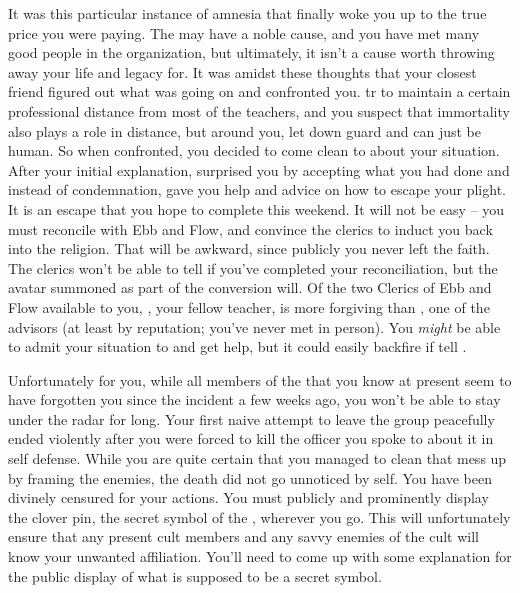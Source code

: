 \documentclass[char]{GL2020}
\begin{document}
It was this particular instance of amnesia that finally woke you up to the true price you were paying. The \pGoaties{} may have a noble cause, and you have met many good people in the organization, but ultimately, it isn't a cause worth throwing away your life and legacy for. It was amidst these thoughts that your closest friend \cPrincipal{\full} figured out what was going on and confronted you. \cPrincipal{\They} tr\cPrincipal{\pluralY} to maintain a certain professional distance from most of the teachers, and you suspect that \cPrincipal{\their} immortality also plays a role in \cPrincipal{\their} distance, but around you, \cPrincipal{\they} let\cPrincipal{\plural} down \cPrincipal{\their} guard and can just be human. So when confronted, you decided to come clean to \cPrincipal{\them} about your situation. After your initial explanation, \cPrincipal{} surprised you by accepting what you had done and instead of condemnation, gave you help and advice on how to escape your plight. It is an escape that you hope to complete this weekend. It will not be easy – you must reconcile with Ebb and Flow, and convince the clerics to induct you back into the religion. That will be awkward, since publicly you never left the faith. The clerics won't be able to tell if you've completed your reconciliation, but the avatar summoned as part of the conversion will. Of the two Clerics of Ebb and Flow available to you, \cFlowPriest{\full}, your fellow teacher, is more forgiving than \cEbbPriest{\full}, one of the advisors (at least by reputation; you've never met \cEbbPriest{} in person). You \emph{might} be able to admit your situation to \cFlowPriest{} and get \cFlowPriest{\their} help, but it could easily backfire if \cFlowPriest{\they} tell\cFlowPriest{\plural} \cEbbPriest{}.

Unfortunately for you, while all members of the \pGoaties{} that you know at present seem to have forgotten you since the incident a few weeks ago, you won't be able to stay under the radar for long. Your first naive attempt to leave the group peacefully ended violently after you were forced to kill the officer you spoke to about it in self defense. While you are quite certain that you managed to clean that mess up by framing the \pGoaties{} enemies, the death did not go unnoticed by \cGenesis{} \cGenesis{\them}self. You have been divinely censured for your actions. You must publicly and prominently display the clover pin, the secret symbol of the \pGoaties{}, wherever you go. This will unfortunately ensure that any present cult members and any savvy enemies of the cult will know your unwanted affiliation. You'll need to come up with some explanation for the public display of what is supposed to be a secret symbol.
\end{document}
